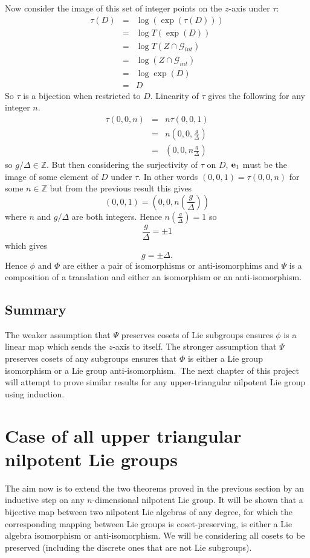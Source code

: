 \documentclass[honours]{UNSWthesis}
\newcommand{\Z}{\mathbb{Z}}
\newcommand{\G}{\mathcal{G}}
\newcommand{\1}{\mathbf{e}_{1}}
\newcommand{\2}{\mathbf{e}_{3}}
\newcommand{\3}{\mathbf{e}_{3}}
\begin{document}
Now consider the image of this set of integer points on the $z$-axis under $\tau$:
\begin{eqnarray*}
\tau(D)&=& \log(\exp (\tau(D))) \\
&=& \log T(\exp (D)) \\
&=& \log T(Z \cap \G_{int}) \\
&=& \log (Z \cap \G_{int}) \\
&=& \log \exp (D) \\
&=& D
\end{eqnarray*}
So $\tau$ is a bijection when restricted to $D$. Linearity of $\tau$ gives the following for any integer $n$.
\begin{eqnarray*}
\tau (0,0,n) &=& n \tau (0,0,1) \\
&=& n\left(0,0, \frac{g}{\Delta}\right) \\
&=& \left(0,0, n \frac{g}{\Delta}\right)
\end{eqnarray*}
so $g/\Delta \in \Z$. But then considering the surjectivity of $\tau$ on $D$, ${\bf e}_{1}$ must be the image of some element of $D$ under $\tau$. In other words $(0,0,1)=\tau(0,0,n)$ for some $n \in \Z$ but from the previous result this gives 
\[
(0,0,1)=\left(0,0, n\left(\frac{g}{\Delta}\right)\right)
\]
where $n$ and $g/\Delta$ are both integers. Hence $n \left( \frac{g}{\Delta}\right)=1$ so 
\[
\frac{g}{\Delta}= \pm 1
\]
which gives
\[
g=\pm \Delta.
\]
Hence $\phi$ and $\Phi$ are either a pair of isomorphisms or anti-isomorphims and $\Psi$ is a composition of a translation and either an isomorphism or an anti-isomorphism.

\section{Summary}
The weaker assumption that $\Psi$ preserves cosets of Lie subgroups ensures $\phi$ is a linear map which sends the $z$-axis to itself. The stronger assumption that $\Psi$ preserves cosets of any subgroups ensures that $\Phi$ is either a Lie group isomorphism or a Lie group anti-isomorphism.\
The next chapter of this project will attempt to prove similar results for any upper-triangular nilpotent Lie group using induction. 






\chapter{Case of all upper triangular nilpotent Lie groups}
The aim now is to extend the two theorems proved in the previous section by an inductive step on any $n$-dimensional nilpotent Lie group. It will be shown that a bijective map between two nilpotent Lie algebras of any degree, for which the corresponding mapping between Lie groups is coset-preserving, is either a Lie algebra isomorphism or anti-isomorphism. We will be considering all cosets to be preserved (including the discrete ones that are not Lie subgroups). 
\end{document}

